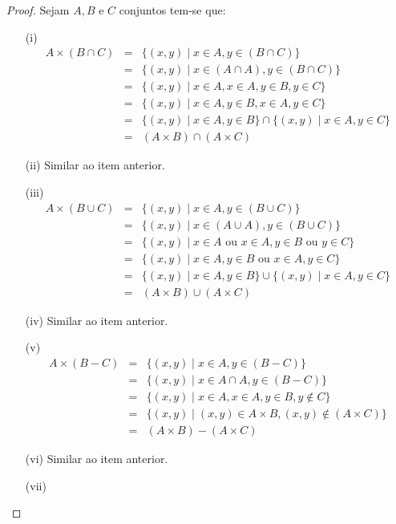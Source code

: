 \begin{proof}
	Sejam $A, B$ e $C$ conjuntos tem-se que:
	\begin{itemize}
		\item[(i)] 
		\begin{eqnarray*}
			A \times (B \cap C) & = & \{(x, y) \mid x \in A, y \in (B \cap C)\}\\
			& = & \{(x, y) \mid x \in (A \cap A), y \in (B \cap C)\}\\
			& = & \{(x, y) \mid x \in A, x \in A, y \in B, y \in C\}\\
			& = & \{(x, y) \mid x \in A, y \in B, x \in A, y \in C\}\\
			& = & \{(x, y) \mid x \in A, y \in B\} \cap \{(x, y) \mid x \in A, y \in C\}\\
			& = & (A \times B) \cap (A \times C)
		\end{eqnarray*}
		\item[(ii)] Similar ao item anterior.
		\item[(iii)]
		\begin{eqnarray*}
			A \times (B \cup C) & = & \{(x, y) \mid x \in A, y \in (B \cup C)\}\\
			& = & \{(x, y) \mid x \in (A \cup A), y \in (B \cup C)\}\\
			& = & \{(x, y) \mid x \in A \text{ ou } x \in A, y \in B \text{ ou } y \in C\}\\
			& = & \{(x, y) \mid x \in A, y \in B \text{ ou } x \in A, y \in C\}\\
			& = & \{(x, y) \mid x \in A, y \in B\} \cup \{(x, y) \mid x \in A, y \in C\}\\
			& = & (A \times B) \cup (A \times C)
		\end{eqnarray*}
		\item[(iv)] Similar ao item anterior.
		\item[(v)]
		\begin{eqnarray*}
			A \times (B - C) & = & \{(x, y) \mid x \in A, y \in (B-C)\}\\
			& = & \{(x, y) \mid x \in A \cap A, y \in (B-C)\}\\
			& = & \{(x, y) \mid x \in A, x \in A, y \in B, y \notin C\}\\
			& = & \{(x, y) \mid (x, y) \in A \times B, (x, y) \notin (A \times  C)\}\\
			& = & (A \times B) - (A \times C)
		\end{eqnarray*}
		\item[(vi)] Similar ao item anterior.
		\item[(vii)]

\end{itemize}
\end{proof}
